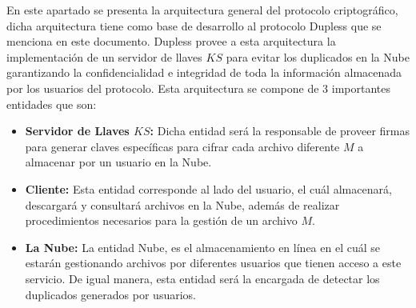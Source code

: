 En este apartado se presenta la arquitectura general del protocolo criptográfico, dicha arquitectura tiene como base de desarrollo al protocolo Dupless que se menciona en este documento. Dupless provee a esta arquitectura la implementación de un servidor de llaves $KS$ para evitar los duplicados en la Nube garantizando la confidencialidad e integridad de toda la información almacenada por los usuarios del protocolo. Esta arquitectura se compone de 3 importantes entidades que son: 
\begin{itemize}
	\item \textbf{Servidor de Llaves $KS$: } Dicha entidad será la responsable de proveer firmas para generar claves específicas para cifrar cada archivo diferente $M$ a almacenar por un usuario en la Nube.
	\item \textbf{Cliente: } Esta entidad corresponde al lado del usuario, el cuál almacenará, descargará y consultará archivos en la Nube, además de realizar procedimientos necesarios para la gestión de un archivo $M$. 
	\item \textbf{La Nube: } La entidad Nube, es el almacenamiento en línea en el cuál se estarán gestionando archivos por diferentes usuarios que tienen acceso a este servicio. De igual manera, esta entidad será la encargada de detectar los duplicados generados por usuarios.
\end{itemize}

